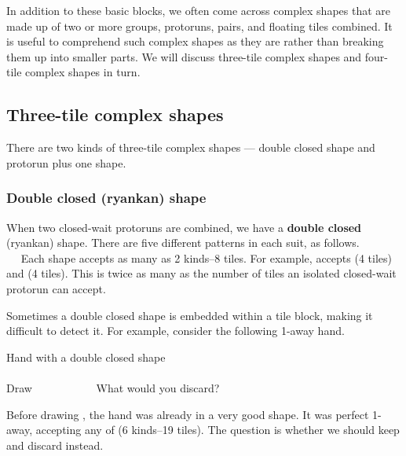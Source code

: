 \bigskip
In addition to these basic blocks, we often come across complex shapes that are made up of two or more groups, protoruns, pairs, and floating tiles combined. It is useful to comprehend such complex shapes as they are rather than breaking them up into smaller parts. We will discuss three-tile complex shapes and four-tile complex shapes in turn. 

\subsection{Three-tile complex shapes} 

There are two kinds of three-tile complex shapes --- double closed shape and protorun plus one shape.

\vfill
\subsubsection{Double closed ({\jap ryankan}) shape} \label{sec:ryankan}
When two closed-wait protoruns are combined, we have a {\bf double closed} ({\jap ryankan}) shape. 
There are five different patterns in each suit, as follows.
\bp
{}~~~~\\
~~
\ep
Each shape accepts as many as 2 kinds--8 tiles. For example, {\LARGE{}} accepts {\LARGE{}} (4 tiles) and {\LARGE{}} (4 tiles). This is twice as many as the number of tiles an isolated closed-wait protorun can accept. 

\bigskip
Sometimes a double closed shape is embedded within a tile block, making it difficult to detect it. 
For example, consider the following 1-away hand. 
\begin{itembox}[r]{Hand with a double closed shape}
\vspace{-5pt}
\bp
{}\\ \vspace{-16pt}
\rfw{}~\\
\hfill\footnotesize{Draw~~~~~~~~~~~}
\ep
\vspace{-15pt}What would you discard? \vspace{-5pt}
\end{itembox}
\noindent
Before drawing {\LARGE{}}, the hand was already in a very good shape. It was perfect 1-away, accepting any of {\LARGE{}} (6 kinds--19 tiles). The question is whether we should keep {\LARGE{}} and discard {\LARGE{}} instead. 

